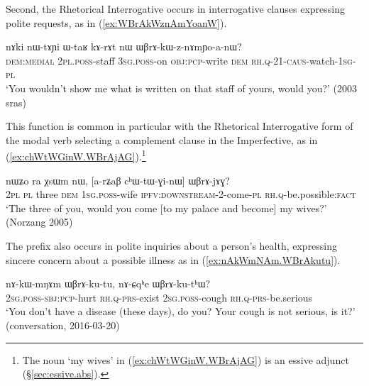 Second, the Rhetorical Interrogative occurs in interrogative clauses expressing polite requests, as in (\ref{ex:WBrAkWznAmYoanW}).   

\begin{exe}
\ex \label{ex:WBrAkWznAmYoanW}
 \gll nɤki nɯ-tɤɲi ɯ-taʁ kɤ-rɤt nɯ ɯβrɤ-kɯ-z-nɤmɲo-a-nɯ? \\
 \textsc{dem}:\textsc{medial} \textsc{2pl}.\textsc{poss}-staff \textsc{3sg}.\textsc{poss}-on \textsc{obj}:\textsc{pcp}-write \textsc{dem} \textsc{rh}.\textsc{q}-2\fl{}1-\textsc{caus}-watch-\textsc{1sg}-\textsc{pl} \\
 \glt `You wouldn't show me what is written on that staff of yours, would you?' (2003 sras)
\end{exe}

 This function is common in particular with the Rhetorical Interrogative form  of the modal verb  selecting a complement clause in the Imperfective, as in (\ref{ex:chWtWGinW.WBrAjAG}).\footnote{The noun  `my wives' in (\ref{ex:chWtWGinW.WBrAjAG}) is an essive adjunct (§\ref{sec:essive.abs}).  }
 

\begin{exe}
\ex \label{ex:chWtWGinW.WBrAjAG}
 \gll nɯʑo ra χsɯm nɯ, [a-rʑaβ cʰɯ-tɯ-ɣi-nɯ] ɯβrɤ-jɤɣ? \\
 \textsc{2pl} \textsc{pl} three \textsc{dem} \textsc{1sg}.\textsc{poss}-wife \textsc{ipfv}:\textsc{downstream}-2-come-\textsc{pl} \textsc{rh}.\textsc{q}-be.possible:\textsc{fact} \\
 \glt `The three of you, would you come [to my palace and become] my wives?' (Norzang 2005)
\end{exe}

The prefix  also occurs in polite inquiries about a person's health, expressing sincere concern about a possible illness as in (\ref{ex:nAkWmNAm.WBrAkutu}).

\begin{exe}
\ex \label{ex:nAkWmNAm.WBrAkutu}
 \gll  nɤ-kɯ-mŋɤm ɯβrɤ-ku-tu, nɤ-ɕqʰe ɯβrɤ-ku-tʰɯ? \\
\textsc{2sg}.\textsc{poss}-\textsc{sbj}:\textsc{pcp}-hurt  \textsc{rh}.\textsc{q}-\textsc{prs}-exist 
\textsc{2sg}.\textsc{poss}-cough  \textsc{rh}.\textsc{q}-\textsc{prs}-be.serious \\
\glt `You don't have a disease (these days), do you? Your cough is not serious, is it?' (conversation, 2016-03-20)
\end{exe}

